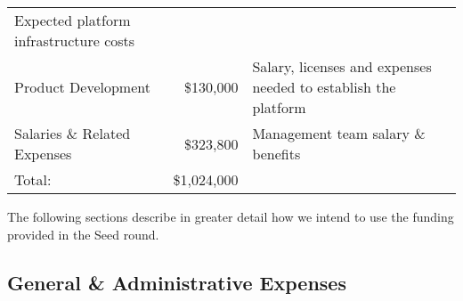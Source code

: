 \documentclass[10pt,openany]{book}
\begin{document}
\begin{longtable}[]{@{}lrl@{}}
\begin{minipage}[t]{0.50\columnwidth}
Expected platform infrastructure costs\strut
\end{minipage}\tabularnewline
\begin{minipage}[t]{0.28\columnwidth}\raggedright
Product Development\strut
\end{minipage} & \begin{minipage}[t]{0.13\columnwidth}\raggedleft
\$130,000\strut
\end{minipage} & \begin{minipage}[t]{0.50\columnwidth}\raggedright
Salary, licenses and expenses needed to establish the platform\strut
\end{minipage}\tabularnewline
\begin{minipage}[t]{0.28\columnwidth}\raggedright
Salaries \& Related Expenses\strut
\end{minipage} & \begin{minipage}[t]{0.13\columnwidth}\raggedleft
\$323,800\strut
\end{minipage} & \begin{minipage}[t]{0.50\columnwidth}\raggedright
Management team salary \& benefits\strut
\end{minipage}\tabularnewline
\begin{minipage}[t]{0.28\columnwidth}\raggedright
Total:\strut
\end{minipage} & \begin{minipage}[t]{0.13\columnwidth}\raggedleft
\$1,024,000\strut
\end{minipage} & \begin{minipage}[t]{0.50\columnwidth}\raggedright
\strut
\end{minipage}\tabularnewline
\bottomrule
\end{longtable}

The following sections describe in greater detail how we intend to use
the funding provided in the Seed round.

\hypertarget{general-administrative-expenses}{%
\subsection{General \& Administrative
Expenses}\label{general-administrative-expenses}}
\end{document}
